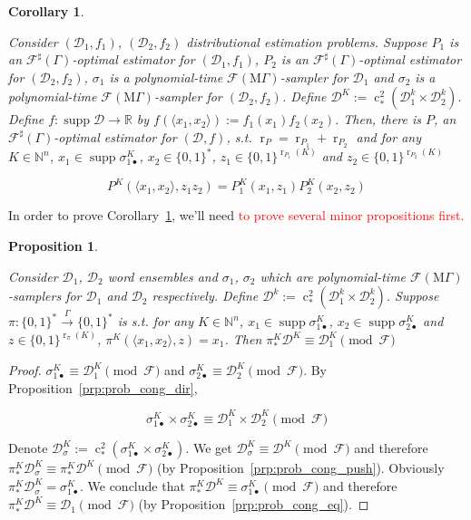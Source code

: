 \documentclass[11pt]{article}
\numberwithin{equation}{section}
\theoremstyle{definition}
\theoremstyle{plain}
\newtheorem{proposition}{Proposition}[section]
\newtheorem{corollary}{Corollary}[section]
\newcommand{\Bool}{\{0,1\}}
\newcommand{\Words}{{\Bool^*}}
\newcommand{\WordsLen}[1]{{\Bool^{#1}}}
\DeclareMathOperator{\Supp}{supp}
\DeclareMathOperator{\R}{r}
\DeclareMathOperator{\En}{c}
\newcommand{\Nats}{\mathbb{N}}
\newcommand{\Reals}{\mathbb{R}}
\newcommand{\Chev}[1]{\langle #1 \rangle}
\newcommand{\Dist}{\mathcal{D}}
\newcommand{\MGrow}{\mathrm{M}\Gamma}
\newcommand{\Fall}{\mathcal{F}}
\newcommand{\ESG}{\Fall^\sharp(\Gamma)}
\newcommand{\EMG}{\Fall(\MGrow)}
\newcommand{\Scheme}{\xrightarrow{\Gamma}}
\begin{document}
\begin{samepage}
\begin{corollary}
\label{crl:dir_prod}

Consider $(\Dist_1,f_1)$, $(\Dist_2,f_2)$ distributional estimation problems. Suppose $P_1$ is an $\ESG$-optimal estimator for $(\Dist_1,f_1)$, $P_2$ is an $\ESG$-optimal estimator for $(\Dist_2,f_2)$, $\sigma_1$ is a polynomial-time $\EMG$-sampler for $\Dist_1$ and $\sigma_2$ is a polynomial-time $\EMG$-sampler for $(\Dist_2,f_2)$. Define ${\Dist^{K}:=\En_*^2(\Dist_1^k \times \Dist_2^k)}$. Define ${f: \Supp \Dist \rightarrow \Reals}$ by ${f(\Chev{x_1,x_2}):=f_1(x_1)f_2(x_2)}$. Then, there is $P$, an $\ESG$-optimal estimator for $(\Dist,f)$, s.t. $\R_P=\R_{P_1}+\R_{P_2}$ and for any $K \in \Nats^n$, $x_1 \in \Supp \sigma_{1\bullet}^{K}$, $x_2 \in \Words$, $z_1 \in \WordsLen{\R_{P_1}(K)}$ and $z_2 \in \WordsLen{\R_{P_2}(K)}$

\begin{equation}
P^{K}(\Chev{x_1,x_2}, z_1 z_2)=P_1^{K}(x_1,z_1) P_2^{K}(x_2,z_2)
\end{equation}

\end{corollary}
\end{samepage}

In order to prove Corollary~\ref{crl:dir_prod}, we'll need \textcolor{red}{to prove several minor propositions first.}

\begin{samepage}
\begin{proposition}
\label{prp:thm__mult__cond1}

Consider $\Dist_1$, $\Dist_2$ word ensembles and $\sigma_1$, $\sigma_2$ which are polynomial-time $\EMG$-samplers for $\Dist_1$ and $\Dist_2$ respectively. Define ${\Dist^k:=\En_*^2(\Dist_1^k \times \Dist_2^k)}$. Suppose $\pi: \Words \Scheme \Words$ is s.t. for any $K \in \Nats^n$, $x_1 \in \Supp \sigma_{1\bullet}^{K}$, ${x_2 \in \Supp \sigma_{2\bullet}^{K}}$ and $z \in \Bool^{\R_\pi(K)}$, $\pi^{K}(\Chev{x_1,x_2},z)=x_1$. Then $\pi_*^K\Dist^{K} \equiv \Dist_1^{K} \pmod \Fall$

\end{proposition}
\end{samepage}

\begin{proof}

$\sigma_{1\bullet}^{K} \equiv \Dist_1^{K} \pmod \Fall$ and $\sigma_{2\bullet}^{K} \equiv \Dist_2^{K} \pmod \Fall$.  By Proposition~\ref{prp:prob_cong_dir},

\[\sigma_{1\bullet}^{K} \times \sigma_{2\bullet}^{K} \equiv \Dist_1^{K} \times \Dist_2^{K} \pmod \Fall\]

Denote $\Dist_\sigma^{K}:=\En_*^2(\sigma_{1\bullet}^{K} \times \sigma_{2\bullet}^{K})$. We get ${\Dist_\sigma^{K} \equiv \Dist^{K} \pmod \Fall}$ and therefore ${\pi_*^K\Dist_\sigma^{K} \equiv \pi_*^K\Dist^{K} \pmod \Fall}$ (by Proposition~\ref{prp:prob_cong_push}). Obviously $\pi_*^K\Dist_\sigma^{K}=\sigma_{1\bullet}^{K}$. We conclude that ${\pi_*^K\Dist^{K} \equiv \sigma_{1\bullet}^{K} \pmod \Fall}$ and therefore ${\pi_*^K\Dist^{K} \equiv \Dist_1 \pmod \Fall}$ (by Proposition~\ref{prp:prob_cong_eq}).
\end{proof}
\end{document}
